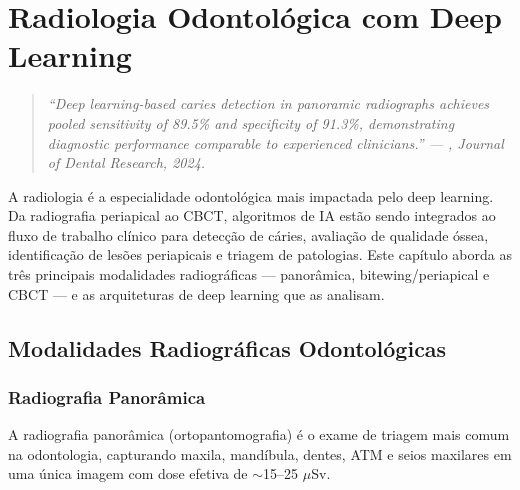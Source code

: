 
\chapter{Radiologia Odontológica com Deep Learning}
\label{cap:radiologia-dl}

\nivelquatro

\begin{quote}
\itshape\small
``Deep learning-based caries detection in panoramic radiographs achieves pooled
sensitivity of 89.5\% and specificity of 91.3\%, demonstrating diagnostic
performance comparable to experienced clinicians.'' --- ,
Journal of Dental Research, 2024.
\end{quote}

A radiologia é a especialidade odontológica mais impactada pelo deep learning.
Da radiografia periapical ao CBCT, algoritmos de IA estão sendo integrados ao
fluxo de trabalho clínico para detecção de cáries, avaliação de qualidade óssea,
identificação de lesões periapicais e triagem de patologias. Este capítulo aborda
as três principais modalidades radiográficas --- panorâmica, bitewing/periapical
e CBCT --- e as arquiteturas de deep learning que as analisam.


\section{Modalidades Radiográficas Odontológicas}
\label{sec:modalidades}

\subsection{Radiografia Panorâmica}

A radiografia panorâmica (ortopantomografia) é o exame de triagem mais comum
na odontologia, capturando maxila, mandíbula, dentes, ATM e seios maxilares
em uma única imagem com dose efetiva de $\sim$15--25 $\mu$Sv.


